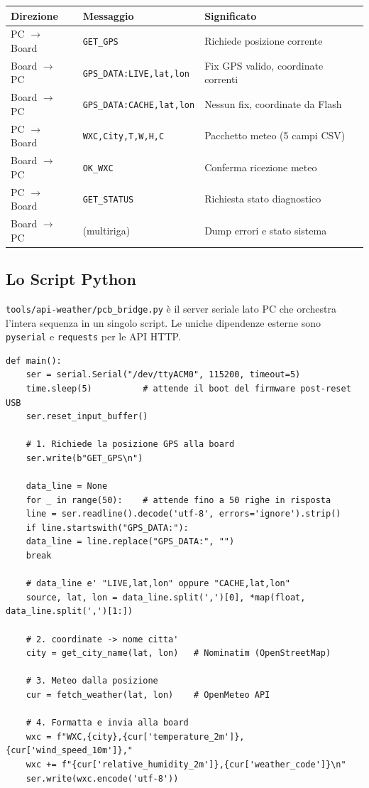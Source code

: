 \begin{tabularx}{\textwidth}{@{}l l X@{}}
	\toprule
	\textbf{Direzione} & \textbf{Messaggio} & \textbf{Significato} \\
	\midrule
	PC $\to$ Board & \texttt{GET\_GPS} & Richiede posizione corrente \\
	Board $\to$ PC & \texttt{GPS\_DATA:LIVE,lat,lon} & Fix GPS valido, coordinate correnti \\
	Board $\to$ PC & \texttt{GPS\_DATA:CACHE,lat,lon} & Nessun fix, coordinate da Flash \\
	PC $\to$ Board & \texttt{WXC,City,T,W,H,C} & Pacchetto meteo (5 campi CSV) \\
	Board $\to$ PC & \texttt{OK\_WXC} & Conferma ricezione meteo \\
	PC $\to$ Board & \texttt{GET\_STATUS} & Richiesta stato diagnostico \\
	Board $\to$ PC & (multiriga) & Dump errori e stato sistema \\
	\bottomrule
\end{tabularx}


\subsection{Lo Script Python}

\texttt{tools/api-weather/pcb\_bridge.py} è il server seriale lato PC che
orchestra l'intera sequenza in un singolo script. Le uniche dipendenze esterne sono \texttt{pyserial} e \texttt{requests} per le API HTTP.

\begin{lstlisting}[style=py, caption={pcb\_bridge.py --- flusso principale}]
	def main():
	ser = serial.Serial("/dev/ttyACM0", 115200, timeout=5)
	time.sleep(5)          # attende il boot del firmware post-reset USB
	ser.reset_input_buffer()
	
	# 1. Richiede la posizione GPS alla board
	ser.write(b"GET_GPS\n")
	
	data_line = None
	for _ in range(50):    # attende fino a 50 righe in risposta
	line = ser.readline().decode('utf-8', errors='ignore').strip()
	if line.startswith("GPS_DATA:"):
	data_line = line.replace("GPS_DATA:", "")
	break
	
	# data_line e' "LIVE,lat,lon" oppure "CACHE,lat,lon"
	source, lat, lon = data_line.split(',')[0], *map(float, data_line.split(',')[1:])
	
	# 2. coordinate -> nome citta'
	city = get_city_name(lat, lon)   # Nominatim (OpenStreetMap)
	
	# 3. Meteo dalla posizione
	cur = fetch_weather(lat, lon)    # OpenMeteo API
	
	# 4. Formatta e invia alla board
	wxc = f"WXC,{city},{cur['temperature_2m']},{cur['wind_speed_10m']},"
	wxc += f"{cur['relative_humidity_2m']},{cur['weather_code']}\n"
	ser.write(wxc.encode('utf-8'))
\end{lstlisting}

